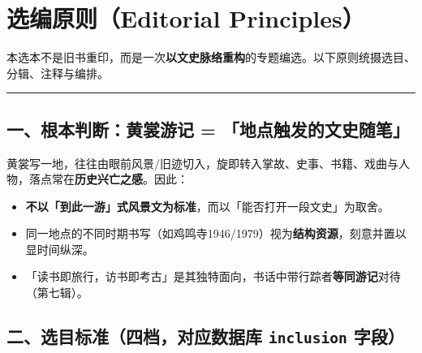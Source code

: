 \documentclass[UTF8,fontset=none,zihao=-4,a4paper]{ctexart}
\begin{document}
\section{选编原则（Editorial Principles）}


本选本不是旧书重印，而是一次\textbf{以文史脉络重构}的专题编选。以下原则统摄选目、分辑、注释与编排。


\medskip\hrule\medskip

\subsection{一、根本判断：黄裳游记 = 「地点触发的文史随笔」}


黄裳写一地，往往由眼前风景/旧迹切入，旋即转入掌故、史事、书籍、戏曲与人物，落点常在\textbf{历史兴亡之感}。因此：


\begin{itemize}
\item \textbf{不以「到此一游」式风景文为标准}，而以「能否打开一段文史」为取舍。
\item 同一地点的不同时期书写（如鸡鸣寺1946/1979）视为\textbf{结构资源}，刻意并置以显时间纵深。
\item 「读书即旅行，访书即考古」是其独特面向，书话中带行踪者\textbf{等同游记}对待（第七辑）。
\end{itemize}


\subsection{二、选目标准（四档，对应数据库 \texttt{inclusion} 字段）}
\end{document}
